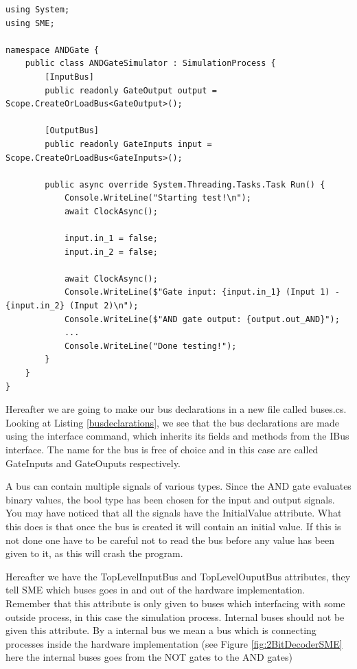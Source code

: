 \begin{lstlisting}[language={[Sharp]C}, caption={The simulator file, which specifies how the simulation is run. Most lines in the run method are concatenated brievity.},captionpos=b, label = simulatorfile]
using System;
using SME;

namespace ANDGate {
    public class ANDGateSimulator : SimulationProcess {
        [InputBus]
        public readonly GateOutput output = Scope.CreateOrLoadBus<GateOutput>();
        
        [OutputBus]
        public readonly GateInputs input = Scope.CreateOrLoadBus<GateInputs>();
        
        public async override System.Threading.Tasks.Task Run() {
            Console.WriteLine("Starting test!\n");
            await ClockAsync();
            
            input.in_1 = false;
            input.in_2 = false;
            
            await ClockAsync();
            Console.WriteLine($"Gate input: {input.in_1} (Input 1) - {input.in_2} (Input 2)\n");
            Console.WriteLine($"AND gate output: {output.out_AND}");
            ...
            Console.WriteLine("Done testing!");
        }
    }
}
\end{lstlisting}

        Hereafter we are going to make our bus declarations in a new file called buses.cs. Looking at Listing \ref{busdeclarations}, we see that the bus declarations are made using the interface command, which inherits its fields and methods from the IBus interface. The name for the bus is free of choice and in this case are called GateInputs and GateOuputs respectively.
        
        A bus can contain multiple signals of various types. Since the AND gate evaluates binary values, the bool type has been chosen for the input and output signals. You may have noticed that all the signals have the InitialValue attribute. What this does is that once the bus is created it will contain an initial value. If this is not done one have to be careful not to read the bus before any value has been given to it, as this will crash the program.
        
        Hereafter we have the TopLevelInputBus and TopLevelOuputBus attributes, they tell SME which buses goes in and out of the hardware implementation. Remember that this attribute is only given to buses which interfacing with some outside process, in this case the simulation process. Internal buses should not be given this attribute. By a internal bus we mean a bus which is connecting processes inside the hardware implementation (see Figure \ref{fig:2BitDecoderSME} here the internal buses goes from the NOT gates to the AND gates) 

